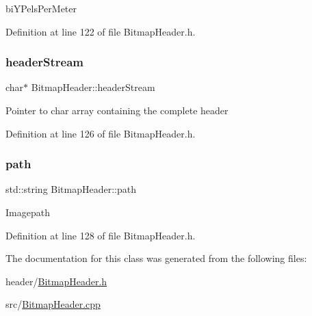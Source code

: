 bi\+Y\+Pels\+Per\+Meter 

Definition at line 122 of file Bitmap\+Header.\+h.

\mbox{\label{classBitmapHeader_a9109a897251733f77942008318482426}} 
\subsubsection{\texorpdfstring{headerStream}{headerStream}}
{\footnotesize\ttfamily char$\ast$ Bitmap\+Header\+::header\+Stream\hspace{0.3cm}{\ttfamily [private]}}

Pointer to char array containing the complete header 

Definition at line 126 of file Bitmap\+Header.\+h.

\mbox{\label{classBitmapHeader_a928111fbaf59eebf24b750cbca11c5dd}} 
\subsubsection{\texorpdfstring{path}{path}}
{\footnotesize\ttfamily std\+::string Bitmap\+Header\+::path\hspace{0.3cm}{\ttfamily [private]}}

Imagepath 

Definition at line 128 of file Bitmap\+Header.\+h.



The documentation for this class was generated from the following files\+:\begin{DoxyCompactItemize}
\item 
header/\mbox{\hyperlink{BitmapHeader_8h}{Bitmap\+Header.\+h}}\item 
src/\mbox{\hyperlink{BitmapHeader_8cpp}{Bitmap\+Header.\+cpp}}\end{DoxyCompactItemize}
